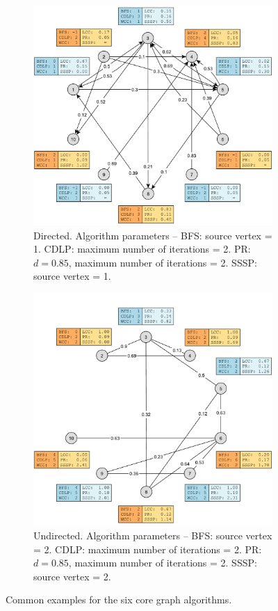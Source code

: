 \begin{figure}[h]
	\centering
	\begin{subfigure}{\textwidth}
		\centering
		\includegraphics[scale=\examplescale]{figures/examples/common-dir.pdf}
		\caption{Directed. Algorithm parameters --
			BFS: source vertex = 1.
			CDLP: maximum number of iterations = 2.
			PR: $d = 0.85$, maximum number of iterations = 2.
			SSSP: source vertex = 1.}
	\end{subfigure}
	\begin{subfigure}{\textwidth}
		\centering
		\includegraphics[scale=\examplescale]{figures/examples/common-undir.pdf}
		\caption{Undirected. Algorithm parameters --
			BFS: source vertex = 2.
			CDLP: maximum number of iterations = 2.
			PR: $d = 0.85$, maximum number of iterations = 2.
			SSSP: source vertex = 2.}
	\end{subfigure}
	\caption{Common examples for the six core graph algorithms.}
	\label{fig:common_example}
\end{figure}
